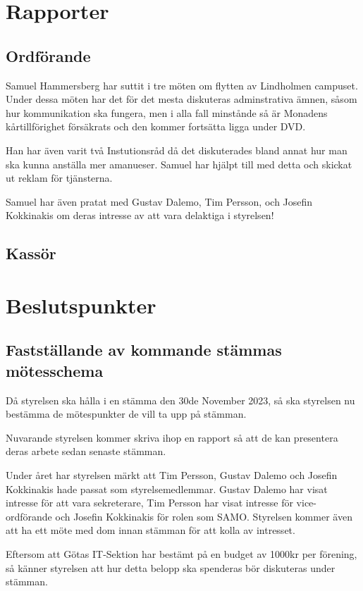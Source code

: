 \documentclass[protokoll]{dvd}
\begin{document}
\newpage

\section{Rapporter}
\subsection*{Ordförande}
Samuel Hammersberg har suttit i tre möten om flytten av Lindholmen campuset.
Under dessa möten har det för det mesta diskuteras adminstrativa ämnen, såsom 
hur kommunikation ska fungera, men i alla fall minstånde så är Monadens 
kårtillförighet försäkrats och den kommer fortsätta ligga under DVD.

Han har även varit två Instutionsråd då det diskuterades bland annat hur man ska
kunna anställa mer amanueser. Samuel har hjälpt till med detta och skickat ut reklam 
för tjänsterna.

Samuel har även pratat med Gustav Dalemo, Tim Persson, och Josefin Kokkinakis
om deras intresse av att vara delaktiga i styrelsen!

\subsection*{Kassör}

\section{Beslutspunkter}

\subsection{Fastställande av kommande stämmas mötesschema}
Då styrelsen ska hålla i en stämma den 30de November 2023, så ska styrelsen nu
bestämma de mötespunkter de vill ta upp på stämman.

Nuvarande styrelsen kommer skriva ihop en rapport så att de kan presentera 
deras arbete sedan senaste stämman.

Under året har styrelsen märkt att Tim Persson, Gustav Dalemo och Josefin Kokkinakis
hade passat som styrelsemedlemmar. Gustav Dalemo har visat intresse för att vara 
sekreterare, Tim Persson har visat intresse för vice-ordförande och Josefin Kokkinakis 
för rolen som SAMO. Styrelsen kommer även att ha ett möte med dom innan stämman för att
kolla av intresset.

Eftersom att Götas IT-Sektion har bestämt på en budget av 1000kr per förening,
så känner styrelsen att hur detta belopp ska spenderas bör diskuteras under stämman.
\end{document}
